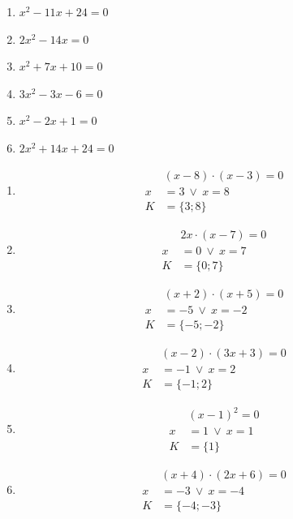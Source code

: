 \documentclass[11pt,a4paper]{article}
\begin{document}
\begin{zadaniReseniBox}[title={Domácí úkol}]
\begin{enumerate}[label=\alph*),itemsep=2pt]
\item $x^{2} - 11x + 24=0$
\item $2x^{2} - 14x=0$
\item $x^{2} + 7x + 10=0$
\item $3x^{2} - 3x - 6=0$
\item $x^{2} - 2x + 1=0$
\item $2x^{2} + 14x + 24=0$
\end{enumerate}
\tcblower
\begin{enumerate}[label=\alph*),itemsep=2pt]
\item
\[\begin{aligned}
&\left(x - 8\right) \cdot \left(x - 3\right)=0\\[2pt]
x&=3\ \vee\ x=8\\[2pt]
K&=\{3;8\}
\end{aligned}\]
\item
\[\begin{aligned}
&2x \cdot \left(x - 7\right)=0\\[2pt]
x&=0\ \vee\ x=7\\[2pt]
K&=\{0;7\}
\end{aligned}\]
\item
\[\begin{aligned}
&\left(x + 2\right) \cdot \left(x + 5\right)=0\\[2pt]
x&=-5\ \vee\ x=-2\\[2pt]
K&=\{-5;-2\}
\end{aligned}\]
\item
\[\begin{aligned}
&\left(x - 2\right) \cdot \left(3x + 3\right)=0\\[2pt]
x&=-1\ \vee\ x=2\\[2pt]
K&=\{-1;2\}
\end{aligned}\]
\item
\[\begin{aligned}
&\left(x - 1\right)^{2}=0\\[2pt]
x&=1\ \vee\ x=1\\[2pt]
K&=\{1\}
\end{aligned}\]
\item
\[\begin{aligned}
&\left(x + 4\right) \cdot \left(2x + 6\right)=0\\[2pt]
x&=-3\ \vee\ x=-4\\[2pt]
K&=\{-4;-3\}
\end{aligned}\]
\end{enumerate}
\end{zadaniReseniBox}
\end{document}
